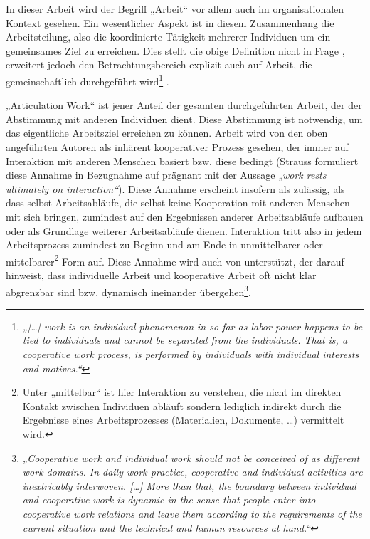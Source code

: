 In dieser Arbeit wird der Begriff „Arbeit“ vor allem auch im organisationalen Kontext gesehen. Ein wesentlicher Aspekt ist in diesem Zusammenhang die Arbeitsteilung, also die koordinierte Tätigkeit mehrerer Individuen um ein gemeinsames Ziel zu erreichen. Dies stellt die obige Definition nicht in Frage \citep{Schmidt94}, erweitert jedoch den Betrachtungsbereich explizit auch auf Arbeit, die gemeinschaftlich durchgeführt wird\footnote{\emph{„[\ldots] work is an individual phenomenon in so far as labor power happens to be tied to individuals and cannot be separated from the individuals. That is, a cooperative work process, is performed by individuals with individual interests and motives.“}\citep[][S. 353 ]{Schmidt94}} . 

„Articulation Work“ ist jener Anteil der gesamten durchgeführten Arbeit, der der Abstimmung mit anderen Individuen dient. Diese Abstimmung ist notwendig, um das eigentliche Arbeitsziel erreichen zu können. Arbeit wird von den oben angeführten Autoren als inhärent kooperativer Prozess gesehen, der immer auf Interaktion mit anderen Menschen basiert bzw. diese bedingt (Strauss formuliert diese Annahme in Bezugnahme auf \citet{Hughes71} prägnant mit der Aussage \emph{„work rests ultimately on interaction“}). Diese Annahme erscheint insofern als zulässig, als dass selbst Arbeitsabläufe, die selbst keine Kooperation mit anderen Menschen mit sich bringen, zumindest auf den Ergebnissen anderer Arbeitsabläufe aufbauen oder als Grundlage weiterer Arbeitsabläufe dienen. Interaktion tritt also in jedem Arbeitsprozess zumindest zu Beginn und am Ende in unmittelbarer oder mittelbarer\footnote{Unter „mittelbar“ ist hier Interaktion zu verstehen, die nicht im direkten Kontakt zwischen Individuen abläuft sondern lediglich indirekt durch die Ergebnisse eines Arbeitsprozesses (Materialien, Dokumente, \ldots) vermittelt wird.} Form auf. Diese Annahme wird  auch von \citet{Schmidt94} unterstützt, der darauf hinweist, dass individuelle Arbeit und kooperative Arbeit oft nicht klar abgrenzbar sind bzw. dynamisch ineinander übergehen\footnote{\emph{„Cooperative work and individual work should not be conceived of as different work domains. In daily work practice, cooperative and individual activities are inextricably interwoven. [\ldots] More than that, the boundary between individual and cooperative work is dynamic in the sense that people enter into cooperative work relations and leave them according to the requirements of the current situation and the technical and human resources at hand.“}\citep[][S. 352]{Schmidt94}}.

